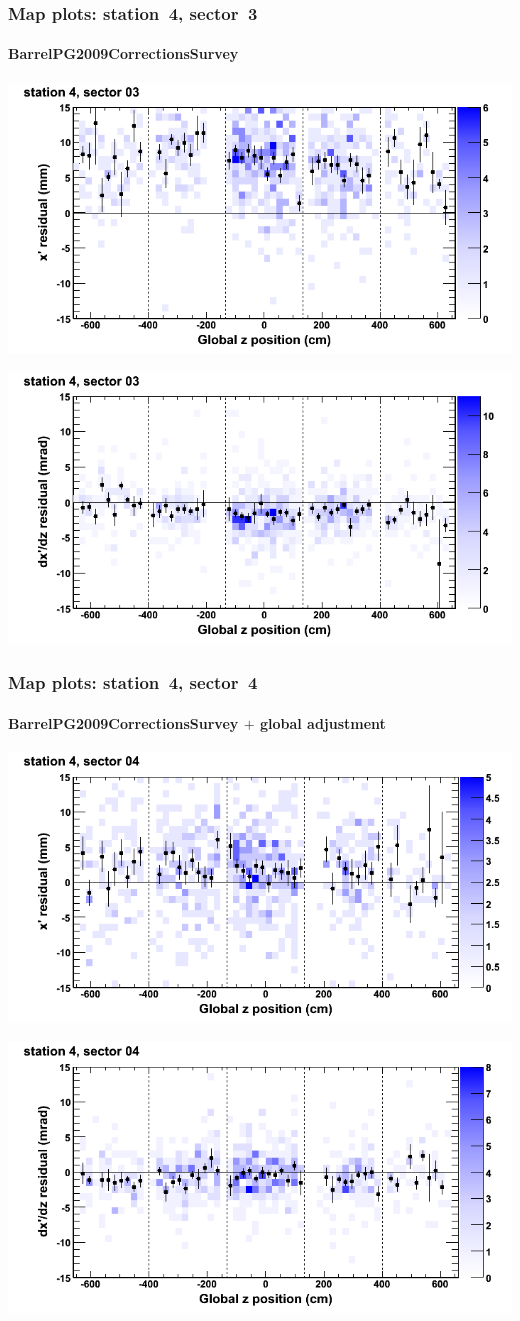 \documentclass[compress]{beamer}
\begin{document}
\begin{frame}
\frametitle{Map plots: station~4, sector~3}
\framesubtitle{BarrelPG2009CorrectionsSurvey}
\includegraphics[width=0.5\linewidth]{mapplots_01/DTvsz_st4sec03_x.png}

\includegraphics[width=0.5\linewidth]{mapplots_01/DTvsz_st4sec03_dxdz.png}
\end{frame}
\begin{frame}
\frametitle{Map plots: station~4, sector~4}
\framesubtitle{BarrelPG2009CorrectionsSurvey $+$ global adjustment}
\includegraphics[width=0.5\linewidth]{mapplots_re01/DTvsz_st4sec04_x.png}

\includegraphics[width=0.5\linewidth]{mapplots_re01/DTvsz_st4sec04_dxdz.png}
\end{frame}
\end{document}
